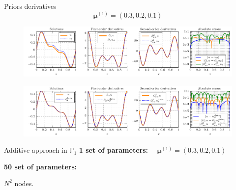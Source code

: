 \begin{appendixframe}{Priors derivatives}
	\vspace{-10pt}
	$$\bm{\mu}^{(1)}=(0.3,0.2,0.1)$$
	\begin{figure}[ht!]
		\centering
		\includegraphics[width=0.95\linewidth]{images/appendix/datavspinns/standalone_solutions_and_errors_PINN.pdf}
	\end{figure}
	
	\begin{figure}[ht!]
		\centering
		\includegraphics[width=0.95\linewidth]{images/appendix/datavspinns/standalone_solutions_and_errors_NN.pdf}
	\end{figure}
\end{appendixframe}

\begin{appendixframe}{Additive approach in $\mathbb{P}_1$}
	\vspace{-2pt}
	\textbf{1 set of parameters:} $\quad \bm{\mu}^{(1)}=(0.3,0.2,0.1)$
	
	\begin{table}[H]
		\centering
	\end{table}

	\vspace{6pt}
	\textbf{50 set of parameters:}

	\begin{table}[H]
		\centering
	\end{table}

	\footnotesize
	$N^2$ nodes.
\end{appendixframe}